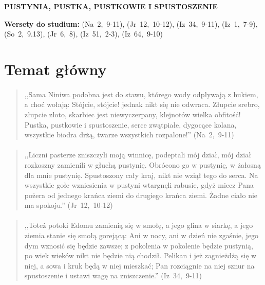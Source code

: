 \documentclass[10pt,a4paper,oneside]{article}
\begin{document}
\centerline{\textbf{\MakeUppercase{Pustynia, pustka, pustkowie i spustoszenie}}}
\begin{center}
\textbf{Wersety do studium:} \mbox{(Na 2, 9-11)}, \mbox{(Jr 12, 10-12)}, \mbox{(Iz 34, 9-11)}, \mbox{(Iz 1, 7-9)}, \mbox{(So 2, 9.13)}, \mbox{(Jr 6, 8)}, \mbox{(Iz 51, 2-3)}, \mbox{(Iz 64, 9-10)}
\end{center}
\section{Temat główny}
\paragraph{}
\begin{quote}
,,Sama Niniwa podobna jest do stawu, którego wody odpływają z hukiem, a choć wołają: Stójcie, stójcie! jednak nikt się nie odwraca. Złupcie srebro, złupcie złoto, skarbiec jest niewyczerpany, klejnotów wielka obfitość! Pustka, pustkowie i spustoszenie, serce zwątpiałe, dygocące kolana, wszystkie biodra drżą, twarze wszystkich rozpalone!'' \mbox{(Na 2, 9-11)}
\end{quote}
\paragraph{}
\begin{quote}
,,Liczni pasterze zniszczyli moją winnicę, podeptali mój dział, mój dział rozkoszny zamienili w głuchą pustynię. Obrócono go w pustynię, w żałosną dla mnie pustynię. Spustoszony cały kraj, nikt nie wziął tego do serca. Na wszystkie gołe wzniesienia w pustyni wtargnęli rabusie, gdyż miecz Pana pożera od jednego krańca ziemi do drugiego krańca ziemi. Żadne ciało nie ma spokoju.'' \mbox{(Jr 12, 10-12)}
\end{quote}
\paragraph{}
\begin{quote}
,,Toteż potoki Edomu zamienią się w smołę, a jego glina w siarkę, a jego ziemia stanie się smołą gorejącą: Ani w nocy, ani w dzień nie zgaśnie, jego dym wznosić się będzie zawsze; z pokolenia w pokolenie będzie pustynią, po wiek wieków nikt nie będzie nią chodził. Pelikan i jeż zagnieżdżą się w niej, a sowa i kruk będą w niej mieszkać; Pan rozciągnie na niej sznur na spustoszenie i ustawi wagę na zniszczenie.'' \mbox{(Iz 34, 9-11)}
\end{quote}
\end{document}
